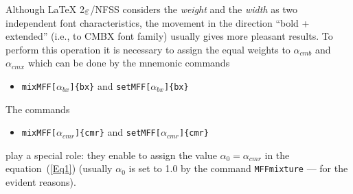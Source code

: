 Although \LaTeX{} 2$_{\hbox{\normalsize$\varepsilon$}}$/NFSS
considers the {\em weight} and the {\em width} as two
independent font characteristics, the movement in the direction
``bold + extended'' (i.e., to CMBX font family) usually gives
more pleasant results.
To perform this operation it is necessary to assign the equal weights
to $\alpha_{cmb}$ and $\alpha_{cmx}$ which can be done
by the mnemonic commands
\begin{itemize}
\item[]{\tt \bs{}mixMFF[$\alpha_{bx}$]\{bx\}}
      \qquad and \qquad
       {\tt \bs{}setMFF[$\alpha_{bx}$]\{bx\}}
\end{itemize}
The commands
\begin{itemize}
\item[]{\tt \bs{}mixMFF[$\alpha_{cmr}$]\{cmr\}}
      \qquad and \qquad
       {\tt \bs{}setMFF[$\alpha_{cmr}$]\{cmr\}}
\end{itemize}
play a special role: they enable to assign the value
$\alpha_0=\alpha_{cmr}$ in the equation~(\ref{Eq1})
(usually $\alpha_0$ is set to 1.0 by the command
{\tt\bs{}MFFmixture} --- for the evident reasons).

